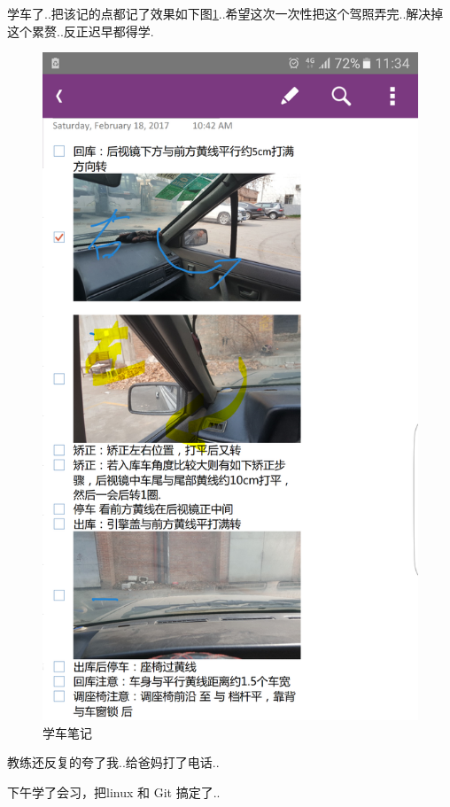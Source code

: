 \documentclass[UTF8,a4paper,8pt]{ctexart}
\begin{document}
	 	 学车了..把该记的点都记了效果如下图\ref{Driver}..希望这次一次性把这个驾照弄完..解决掉这个累赘..反正迟早都得学.
		 	\begin{figure}[!h]
		 		\centering
		 		\includegraphics[scale = 0.2]{Drive.png}
		 		\caption{学车笔记}
		 		\label{Driver}
		 	\end{figure}
	 	 教练还反复的夸了我..给爸妈打了电话..
	 	  
	 	 下午学了会习，把linux 和 Git 搞定了..
	 	 
\end{document}

